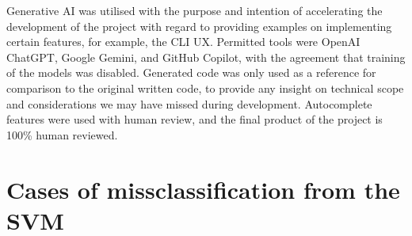 \documentclass[12pt,a4paper,english]{article}
\begin{document}
Generative AI was utilised with the purpose and intention of accelerating the development of the project with regard to providing examples on implementing certain features, for example, the CLI UX. Permitted tools were OpenAI ChatGPT, Google Gemini, and GitHub Copilot, with the agreement that training of the models was disabled. Generated code was only used as a reference for comparison to the original written code, to provide any insight on technical scope and considerations we may have missed during development. Autocomplete features were used with human review, and the final product of the project is 100\% human reviewed.

\section{Cases of missclassification from the SVM}
\end{document}
